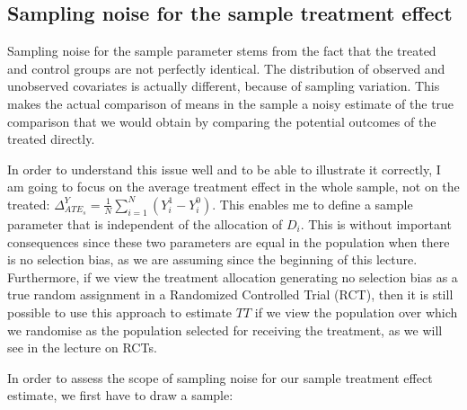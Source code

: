 \documentclass[]{book}
\theoremstyle{definition}
\theoremstyle{definition}
\theoremstyle{definition}
\theoremstyle{remark}
\let\BeginKnitrBlock\begin \let\EndKnitrBlock\end
\begin{document}
\subsection{Sampling noise for the sample treatment
effect}\label{sec:illusnoisesamp}

Sampling noise for the sample parameter stems from the fact that the
treated and control groups are not perfectly identical. The distribution
of observed and unobserved covariates is actually different, because of
sampling variation. This makes the actual comparison of means in the
sample a noisy estimate of the true comparison that we would obtain by
comparing the potential outcomes of the treated directly.

In order to understand this issue well and to be able to illustrate it
correctly, I am going to focus on the average treatment effect in the
whole sample, not on the treated:
\(\Delta^Y_{ATE_s}=\frac{1}{N}\sum_{i=1}^N(Y_i^1-Y_i^0)\). This enables
me to define a sample parameter that is independent of the allocation of
\(D_i\). This is without important consequences since these two
parameters are equal in the population when there is no selection bias,
as we are assuming since the beginning of this lecture. Furthermore, if
we view the treatment allocation generating no selection bias as a true
random assignment in a Randomized Controlled Trial (RCT), then it is
still possible to use this approach to estimate \(TT\) if we view the
population over which we randomise as the population selected for
receiving the treatment, as we will see in the lecture on RCTs.

\BeginKnitrBlock{example}
\protect\hypertarget{exm:unnamed-chunk-34}{}{\label{exm:unnamed-chunk-34}
}In order to assess the scope of sampling noise for our sample treatment
effect estimate, we first have to draw a sample:
\EndKnitrBlock{example}
\end{document}
